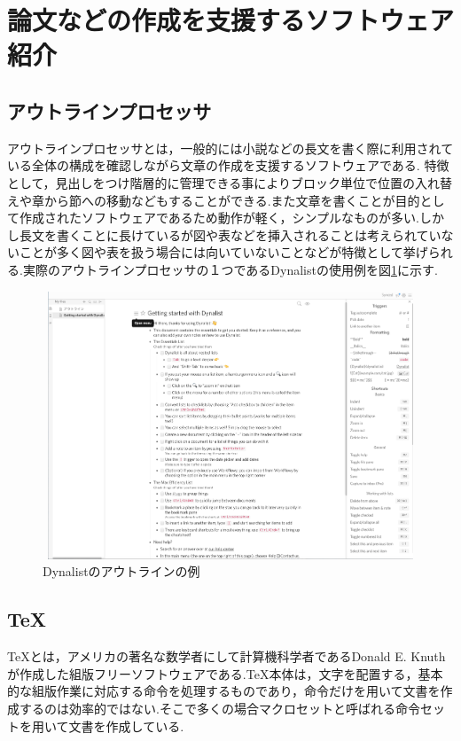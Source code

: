 \documentclass[a4j,12pt]{jarticle}
\begin{document}
\newpage

\section{論文などの作成を支援するソフトウェア紹介}
\subsection{アウトラインプロセッサ}
アウトラインプロセッサとは，一般的には小説などの長文を書く際に利用されている全体の構成を確認しながら文章の作成を支援するソフトウェアである.
特徴として，見出しをつけ階層的に管理できる事によりブロック単位で位置の入れ替えや章から節への移動などもすることができる.また文章を書くことが目的として作成されたソフトウェアであるため動作が軽く，シンプルなものが多い.しかし長文を書くことに長けているが図や表などを挿入されることは考えられていないことが多く図や表を扱う場合には向いていないことなどが特徴として挙げられる.実際のアウトラインプロセッサの１つであるDynalistの使用例を図\ref{fig:b}に示す.
\begin{figure}[H]
\begin{center}
 \includegraphics[clip,width=130mm,height=80mm]{figure/Dynalist.png}
 \end{center}
 \caption{Dynalistのアウトラインの例}
 \label{fig:b}
\end{figure}
\newpage
\subsection{\TeX}
\TeX とは，アメリカの著名な数学者にして計算機科学者であるDonald E. Knuthが作成した組版フリーソフトウェアである.TeX本体は，文字を配置する，基本的な組版作業に対応する命令を処理するものであり，命令だけを用いて文書を作成するのは効率的ではない.そこで多くの場合マクロセットと呼ばれる命令セットを用いて文書を作成している.
\end{document}
